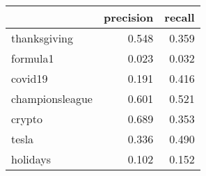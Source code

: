 \begin{tabular}{lrr}
\toprule
{} &  precision &  recall \\
\midrule
thanksgiving    &      0.548 &   0.359 \\
formula1        &      0.023 &   0.032 \\
covid19         &      0.191 &   0.416 \\
championsleague &      0.601 &   0.521 \\
crypto          &      0.689 &   0.353 \\
tesla           &      0.336 &   0.490 \\
holidays        &      0.102 &   0.152 \\
\bottomrule
\end{tabular}
